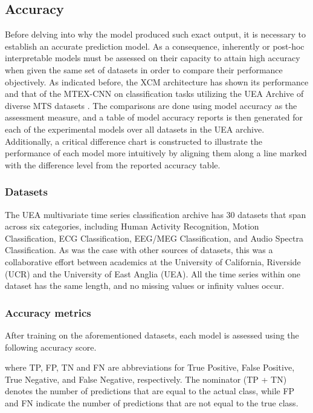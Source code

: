 \documentclass{svproc}
\begin{document}
\subsection{Accuracy}
Before delving into why the model produced such exact output, it is necessary to establish an accurate prediction model. As a consequence, inherently or post-hoc interpretable models must be assessed on their capacity to attain high accuracy when given the same set of datasets in order to compare their performance objectively. As indicated before, the XCM architecture has shown its performance and that of the MTEX-CNN on classification tasks utilizing the UEA Archive of diverse MTS datasets \cite{bagnall2018uea}. The comparisons are done using model accuracy as the assessment measure, and a table of model accuracy reports is then generated for each of the experimental models over all datasets in the UEA archive. Additionally, a critical difference chart is constructed to illustrate the performance of each model more intuitively by aligning them along a line marked with the difference level from the reported accuracy table.

\subsubsection{Datasets}

The UEA multivariate time series classification archive \cite{bagnall2018uea} has 30 datasets that span across six categories, including Human Activity Recognition, Motion Classification, ECG Classification, EEG/MEG Classification, and Audio Spectra Classification. As was the case with other sources of datasets, this was a collaborative effort between academics at the University of California, Riverside (UCR) and the University of East Anglia (UEA). All the time series within one dataset has the same length, and no missing values or infinity values occur. 

\subsubsection{Accuracy metrics}

After training on the aforementioned datasets, each model is assessed using the following accuracy score. 

where TP, FP, TN and FN are abbreviations for True Positive, False Positive, True Negative, and False Negative, respectively. The nominator (TP + TN) denotes the number of predictions that are equal to the actual class, while FP and FN indicate the number of predictions that are not equal to the true class. 
\end{document}
